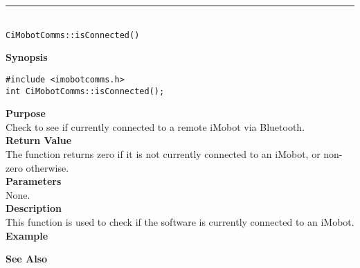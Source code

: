 \noindent
\vspace{5pt}
\rule{4.5in}{0.015in}\\
\noindent
{\LARGE \texttt{CiMobotComms::isConnected()}}\\
{}

\noindent
{\bf Synopsis}\\
\begin{verbatim}
#include <imobotcomms.h>
int CiMobotComms::isConnected();
\end{verbatim}

\noindent
{\bf Purpose}\\
Check to see if currently connected to a remote iMobot via Bluetooth.\\

\noindent
{\bf Return Value}\\
The function returns zero if it is not currently connected to an iMobot, or non-zero otherwise.\\

\noindent
{\bf Parameters}\\
None.\\

\noindent
{\bf Description}\\
This function is used to check if the software is currently connected to
an iMobot.\\

\noindent
{\bf Example}\\
\noindent

\noindent
{\bf See Also}\\

